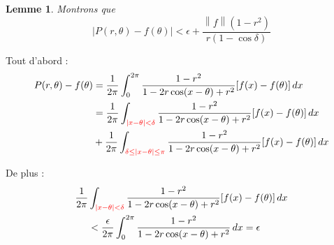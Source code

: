 \documentclass[
	10pt, %
	xcolor={svgnames}
]{beamer}
\newtheorem{lemme}[subsubsection]{Lemme}
\begin{document}
\begin{frame}
	\begin{lemme}
		Montrons que 
	\begin{equation*}
		{\left\lvert P(r,\theta) - f(\theta) \right\rvert} < \epsilon + 
		\frac{{\left\lVert f \right\rVert}(1-r^{2})}{r(1-\cos\delta)}
	\end{equation*}
	\end{lemme}

	Tout d'abord :
	{\footnotesize
		\begin{align*}
		P(r,\theta)-f(\theta) &= \frac{1}{2\pi} \int_0^{2\pi}
		\frac{1 - r^{2}}{1-2r\cos(x-\theta)+r^{2}}
		\lbrack f(x)-f(\theta) \rbrack \, dx \\
				      &= \frac{1}{2\pi} \int_{\mathcolor{red}{{\left\lvert x - \theta \right\rvert} < \delta}} 
		\frac{1 - r^{2}}{1-2r\cos(x-\theta)+r^{2}}
		\lbrack f(x)-f(\theta) \rbrack \, dx \\
				      &+ \frac{1}{2\pi} \int_{\mathcolor{red}{{\delta \leq \left\lvert x - \theta \right\rvert} \leq \pi}} 
		\frac{1 - r^{2}}{1-2r\cos(x-\theta)+r^{2}}
		\lbrack f(x)-f(\theta) \rbrack \, dx \\
	\end{align*}
}

	De plus :
	\begin{align*}
		\frac{1}{2\pi} &\int_{\mathcolor{red}{{\left\lvert x - \theta \right\rvert} < \delta}} 
		\frac{1 - r^{2}}{1-2r\cos(x-\theta)+r^{2}}
		\lbrack f(x)-f(\theta) \rbrack \, dx \\
			       &< \frac{\epsilon}{2\pi} \int_0^{2\pi}
		\frac{1 - r^{2}}{1-2r\cos(x-\theta)+r^{2}} \, dx = \epsilon \\
	\end{align*}
\end{frame}
\end{document}
